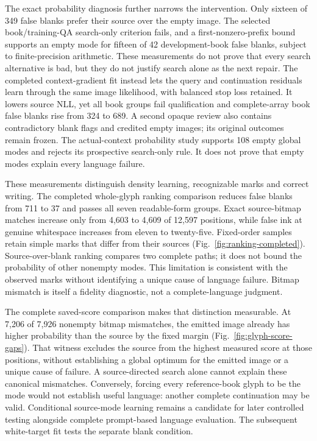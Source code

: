 The exact probability diagnosis further narrows the intervention. Only sixteen
of 349 false blanks prefer their source over the empty image. The selected
book/training-QA search-only criterion fails, and a first-nonzero-prefix bound
supports an empty mode for fifteen of 42 development-book false blanks, subject
to finite-precision arithmetic. These measurements do not prove that every
search alternative is bad, but they do not justify search alone as the next
repair. The completed context-gradient fit instead lets the query and
continuation residuals learn through the same image likelihood, with balanced
stop loss retained. It lowers source NLL, yet all book groups fail qualification
and complete-array book false blanks rise from 324 to 689. A second opaque
review also contains contradictory blank flags and credited empty images; its
original outcomes remain frozen. The actual-context probability study supports
108 empty global modes and rejects its prospective search-only rule. It does
not prove that empty modes explain every language failure.

These measurements distinguish density learning, recognizable marks and correct
writing. The completed whole-glyph ranking comparison reduces false blanks from
711 to 37 and passes all seven readable-form groups. Exact source-bitmap matches
increase only from 4,603 to 4,609 of 12,597 positions, while false ink at genuine
whitespace increases from eleven to twenty-five. Fixed-order samples retain
simple marks that differ from their sources (Fig.~\ref{fig:ranking-completed}).
Source-over-blank ranking compares two complete paths; it does not bound the
probability of other nonempty modes. This limitation is consistent with the
observed marks without identifying a unique cause of language failure. Bitmap
mismatch is itself a fidelity diagnostic, not a complete-language judgment.

The complete saved-score comparison makes that distinction measurable. At
7,206 of 7,926 nonempty bitmap mismatches, the emitted image already has higher
probability than the source by the fixed margin (Fig.~\ref{fig:glyph-score-gaps}).
That witness excludes the source from the highest measured score at those
positions, without establishing a global optimum for the emitted image or a
unique cause of failure. A source-directed search alone cannot explain these
canonical mismatches. Conversely, forcing every reference-book glyph to be the
mode would not establish useful language: another complete continuation may
be valid. Conditional source-mode learning remains a candidate for later
controlled testing alongside complete prompt-based language evaluation. The
subsequent white-target fit tests the separate blank condition.

